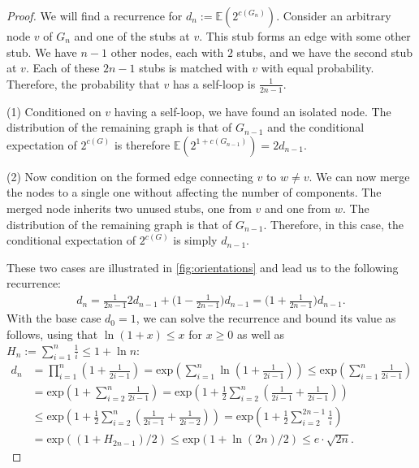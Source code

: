 \documentclass[a4paper,USenglish,cleveref]{lipics-v2021}
\begin{document}
\begin{proof}
  We will find a recurrence for $d_n := 𝔼(2^{c(G_n)})$.
  Consider an arbitrary node $v$ of $G_n$ and one of the stubs at $v$.
  This stub forms an edge with some other stub.
  We have $n-1$ other nodes, each with $2$ stubs, and we have the second stub at $v$. Each of these $2n-1$ stubs is matched with $v$ with equal probability.
  Therefore, the probability that $v$ has a self-loop is $\frac{1}{2n-1}$.

  (1) Conditioned on $v$ having a self-loop, we have found an isolated node.
  The distribution of the remaining graph is that of $G_{n-1}$ and the conditional expectation of $2^{c(G)}$ is therefore $𝔼(2^{1+c(G_{n-1})}) = 2d_{n-1}$.

  (2) Now condition on the formed edge connecting $v$ to $w ≠ v$.
  We can now merge the nodes to a single one without affecting the number of components. The merged node inherits two unused stubs, one from $v$ and one from $w$.
  The distribution of the remaining graph is that of $G_{n-1}$.
  Therefore, in this case, the conditional expectation of $2^{c(G)}$ is simply $d_{n-1}$.

  These two cases are illustrated in \cref{fig:orientations} and lead us to the following recurrence:
  \begin{align*}
    d_{n}=\tfrac{1}{2n-1}2d_{n-1}+\big(1-\tfrac{1}{2n-1}\big)d_{n-1}=\big(1+\tfrac{1}{2n-1}\big)d_{n-1}.
  \end{align*}
  With the base case $d_0=1$, we can solve the recurrence and bound its value as follows, using that $\ln(1+x) \leq x$ for $x \geq 0$ as well as $H_n := \sum_{i = 1}^n \frac 1i ≤ 1 + \ln n$:
  \begin{align*}
    d_n
    &= \prod_{i=1}^n \left( 1 + \frac{1}{2i-1} \right)
    = \textrm{exp}\left(\sum_{i=1}^n \ln\left(1 + \frac{1}{2i-1}\right)\right)
    \leq \textrm{exp}\left(\sum_{i=1}^n \frac{1}{2i-1}\right)\\
    &= \textrm{exp}\left(1 + \sum_{i=2}^n \frac{1}{2i-1}\right)
    = \textrm{exp}\left(1 + \frac{1}{2} \sum_{i=2}^n \left(\frac{1}{2i-1} + \frac{1}{2i-1}\right)\right)\\
    &\leq \textrm{exp}\left(1 + \frac{1}{2} \sum_{i=2}^n \left(\frac{1}{2i-1} + \frac{1}{2i-2}\right)\right)
    = \textrm{exp}\left(1 + \frac{1}{2} \sum_{i=2}^{2n-1} \frac{1}{i}\right)\\
    &= \textrm{exp}\left((1+H_{2n-1})/2\right)
    \leq \textrm{exp}\left(1 + \ln(2n)/2\right)
    \leq e·\sqrt{2n}.
    \tag*{\qedhere}
  \end{align*}
\end{proof}
\end{document}
